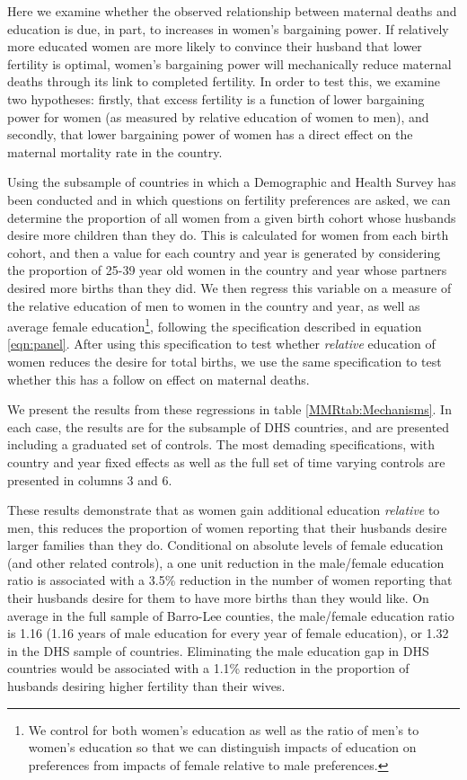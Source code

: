 \documentclass{article}[12pt,subeqn]
\begin{document}
\begin{spacing}{1.4}
Here we examine whether the observed relationship between maternal deaths
and education is due, in part, to increases in women's bargaining power.
If relatively more educated women are more likely to convince their husband
that lower fertility is optimal, women's bargaining power will mechanically
reduce maternal deaths through its link to completed fertility. In order to
test this, we examine two hypotheses: firstly, that excess fertility is a
function of lower bargaining power for women (as measured by relative education
of women to men), and secondly, that lower bargaining power of women has a
direct effect on the maternal mortality rate in the country.

Using the subsample of countries in which a Demographic and Health Survey has
been conducted and in which questions on fertility preferences are asked, we
can determine the proportion of all women from a given birth cohort whose
husbands desire more children than they do.  This is calculated for women
from each birth cohort, and then a value for each country and year is generated
by considering the proportion of 25-39 year old women in the country and
year whose partners desired more births than they did.  We then regress this
variable on a measure of the relative education of men to women in the country
and year, as well as average female education\footnote{We control for both women's
  education as well as the ratio of men's to women's education so that we can
  distinguish impacts of education on preferences from impacts of female relative
  to male preferences.}, following the specification described in equation
\ref{eqn:panel}.  After using this specification to test whether \emph{relative}
education of women reduces the desire for total births, we use the same
specification to test whether this has a follow on effect on maternal deaths.

We present the results from these regressions in table \ref{MMRtab:Mechanisms}.
In each case, the results are for the subsample of DHS countries, and are
presented including a graduated set of controls.  The most demading specifications,
with country and year fixed effects as well as the full set of time varying
controls are presented in columns 3 and 6.

These results demonstrate that as women gain additional education \emph{relative}
to men, this reduces the proportion of women reporting that their husbands desire
larger families than they do.  Conditional on absolute levels of female education
(and other related controls), a one unit reduction in the male/female education
ratio is associated with a 3.5\% reduction in the number of women reporting that
their husbands desire for them to have more births than they would like.  On
average in the full sample of Barro-Lee counties, the male/female education ratio
is 1.16 (1.16 years of male education for every year of female education), or 1.32
in the DHS sample of countries.  Eliminating the male education gap in DHS
countries would be associated with a 1.1\% reduction in the proportion of husbands
desiring higher fertility than their wives.


\end{spacing}
\end{document}
